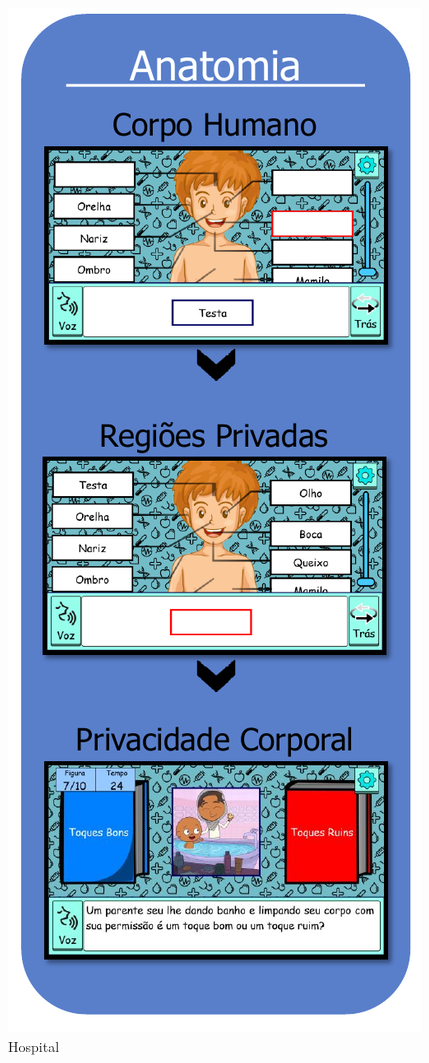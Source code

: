 \begin{figure}%
  \vspace{-20pt}
  \caption{\label{fig:Hospitalzinho}Hospital}
  \includegraphics[width=\linewidth]{./Visuais/Hospital2.pdf}
  \vspace{-1.0cm}
\end{figure}

